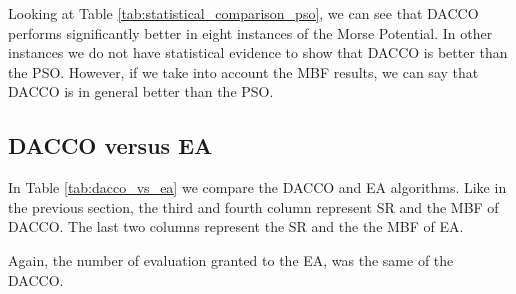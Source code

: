 		Looking at Table \ref{tab:statistical_comparison_pso}, we can see that DACCO performs significantly better in eight instances of the Morse Potential. In other instances we do not have statistical evidence to show that DACCO is better than the PSO. However, if we take into account the MBF results, we can say that DACCO is in general better than the PSO. 
		\pagebreak
		
		\subsection{DACCO versus EA}
		
			In Table \ref{tab:dacco_vs_ea} we compare the DACCO and EA algorithms. Like in the previous section, the third and fourth column represent SR and the MBF of DACCO. The last two columns represent the SR and the the MBF of EA. 
			
			Again, the number of evaluation granted to the EA, was the same of the DACCO. 

